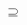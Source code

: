 \documentclass{standalone}
\newcommand*\zhparaleq{%
  \mathrel{\text{%
    \tikz[baseline]
      \draw (0em,0ex) -- (.8em,0ex)
            (0em,.35ex) -- (.8em,.35ex)
            (.24em,.45ex) -- (.37em,1.5ex)
            (.43em,.45ex) -- (.56em,1.5ex);}}}
\newcommand*\zhparalogram{%
  \mathord{\text{%
    \tikz[baseline]
      \draw (0,.1ex) -- (.8em,.1ex) -- (1em,1.4ex) -- (.2em,1.4ex) -- cycle;}}}
\newcommand*\zhsimilar{%
    \mathrel{\text{%
    \raisebox{0.1ex}{%
    \tikz \draw[baseline] (-.17em,.45ex) arc (90:180:0.23em and 0.45ex) arc (180:270:0.45ex) .. controls (0,-.45ex) and (0em,.45ex) .. (.21em,.45ex) arc (90:0:0.45ex) arc (0:-90:0.23em and 0.45ex);%
    }%
}}}
\newcommand*\zhcongruent{%
    \mathrel{\text{%
    \tikz \draw[baseline] (-.22em,-.4ex) arc (-90:-285:0.4ex) (-.22em,-.4ex) .. controls (0,-.4ex) and (0,.4ex) .. (.22em,.4ex) arc (90:-105:0.4ex) (-.4em,-.75ex) -- (.4em,-.75ex) (-.4em,-1.1ex) -- (.4em,-1.1ex);%
}}}
\newcommand\zhparallel{%
	\mathrel{\text{\tikz[baseline]
			\draw (0em,-0.3ex) -- (.4em,1.7ex)
			(.2em,-0.3ex) -- (.6em,1.7ex);
}}}
\newcommand*\zhsubsetneqq{%
	\mathrel{\text{\tikz
		\draw[baseline] (.6636em,1.57ex) -- (.192em,1.57ex) arc (90:270:0.4022ex) -- (.6636em,.7674ex) (0,.2558ex) -- (.6636em,.2558ex) (0,.5116ex) -- (.6636em,.5116ex) (.2323em,0ex) -- (.4313em,.7674ex);%
}}%
}
\newcommand*\zhsubset{%
	\mathrel{\text{\raisebox{.15ex}{\tikz
		\draw[baseline] (.6636em,1.57ex) -- (.20235em,1.57ex) arc (90:270:0.4797ex) -- (.6636em,.61ex) (0,.305ex) -- (.6636em,.305ex);%
}}}%
}
\newcommand*\zhsupsetneqq{%
	\mathrel{\text{\tikz
		\draw[baseline] (-.6636em,1.57ex) -- (-.192em,1.57ex) arc (90:-90:0.4022ex) -- (-.6636em,.7674ex) (0,.2558ex) -- (-.6636em,.2558ex) (0,.5116ex) -- (-.6636em,.5116ex) (-.4313em,0ex) -- (-.2323em,.7674ex);%
	}}%
}
\newcommand*\zhsupset{%
	\mathrel{\text{\raisebox{.15ex}{\tikz
		\draw[baseline] (-.6636em,1.57ex) -- (-.20235em,1.57ex) arc (90:-90:0.4797ex) -- (-.6636em,.61ex) (-.6636em,.305ex) -- (0,.305ex);%
}}}%
}
\begin{document}
$\zhsupset$
\end{document}
